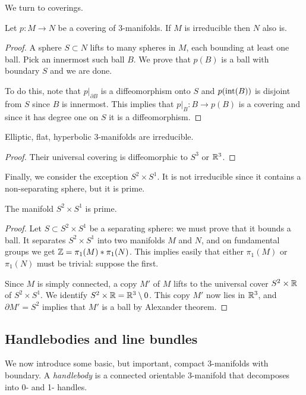 We turn to coverings.

\begin{prop} \label{irreducible:cover:prop}
Let $p\colon  M \to N$ be a covering of 3-manifolds. If $ M$ is irreducible then $N$ also is.
\end{prop}
\begin{proof}
A sphere $S\subset N$ lifts to many spheres in $ M$, each bounding at least one ball. Pick an innermost such ball $B$. We prove that $p(B)$ is a ball with boundary $S$ and we are done.

To do this, note that $p|_{\partial B}$ is a diffeomorphism onto $S$ and $p({\rm int}(B))$ is disjoint from $S$ since $B$ is innermost. This implies that $p|_{B}\colon B \to p(B)$ is a covering and since it has degree one on $S$ it is a diffeomorphism.
\end{proof}

\begin{cor}
Elliptic, flat, hyperbolic 3-manifolds are irreducible.
\end{cor}
\begin{proof}
Their universal covering is diffeomorphic to $S^3$ or $\mathbb{R}^3$.
\end{proof}

Finally, we consider the exception $S^2\times S^1$. It is not irreducible since it contains a non-separating sphere, but it is prime.

\begin{prop} The manifold $S^2\times S^1$ is prime.
\end{prop}
\begin{proof}
Let $S\subset S^2\times S^1$ be a separating sphere: we must prove that it bounds a ball. It separates $S^2\times S^1$ into two manifolds $M$ and $N$, and on fundamental groups we get $\mathbb{Z} = \pi_1(M)*\pi_1(N)$. This implies easily that either $\pi_1(M)$ or $\pi_1(N)$ must be trivial: suppose the first. 

Since $M$ is simply connected, a copy $M'$ of $M$ lifts to the universal cover $S^2\times \mathbb{R}$ of $S^2\times S^1$. We identify $S^2\times\mathbb{R} = \mathbb{R}^3\setminus 0$. This copy $M'$ now lies in $\mathbb{R}^3$, and $\partial M' = S^2$ implies that $M'$ is a ball by Alexander theorem.
\end{proof}

\subsection{Handlebodies and line bundles}
We now introduce some basic, but important, compact 3-manifolds with boundary. A \emph{handlebody} is a connected orientable 3-manifold that decomposes into 0- and 1- handles. 

